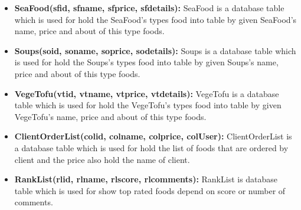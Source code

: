 \documentclass[12pt,a4paper]{article}
\begin{document}
\begin{itemize}
			\item \textbf{SeaFood(sfid, sfname, sfprice, sfdetails):} SeaFood is a database table which is used for hold the SeaFood's types food into table by given SeaFood's name, price and about of this type foods.
			\item \textbf{Soups(soid, soname, soprice, sodetails):} Soups is a database table which is used for hold the Soups's types food into table by given Soups's name, price and about of this type foods.
			\item \textbf{VegeTofu(vtid, vtname, vtprice, vtdetails): }VegeTofu is a database table which is used for hold the VegeTofu's types food into table by given VegeTofu's name, price and about of this type foods.
			\item \textbf{ClientOrderList(colid, colname, colprice, colUser): }ClientOrderList is a database table which is used for hold the list of foods that are ordered by client and the price also hold the name of client. 
			\item \textbf{RankList(rlid, rlname, rlscore, rlcomments): }RankList is database table which is used for show top rated foods depend on score or number of comments.
		\end{itemize}
	
\end{document}
